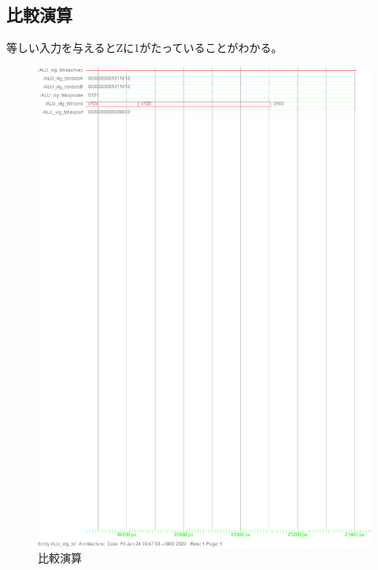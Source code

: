 \documentclass{jsarticle}
\begin{document}
\subsection{比較演算}
等しい入力を与えるとZに1がたっていることがわかる。
\begin{figure}
    \caption{比較演算}
  \includegraphics[scale=0.8]{ALU_cmp.ps}
\end{figure}
\end{document}
